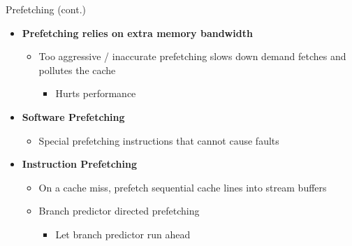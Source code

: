 \documentclass[aspectratio=169,12pt]{beamer}
\begin{document}
\begin{frame}{Prefetching (cont.)}
\begin{itemize}
  \item \textbf{Prefetching relies on extra memory bandwidth}
  \begin{itemize}
    \item Too aggressive / inaccurate prefetching slows down demand fetches and pollutes the cache
    \begin{itemize}
      \item Hurts performance
    \end{itemize}
  \end{itemize}
  
  \item \textbf{Software Prefetching}
  \begin{itemize}
    \item Special prefetching instructions that cannot cause faults
  \end{itemize}
  
  \item \textbf{Instruction Prefetching}
  \begin{itemize}
    \item On a cache miss, prefetch sequential cache lines into stream buffers
    \item Branch predictor directed prefetching
    \begin{itemize}
      \item Let branch predictor run ahead
    \end{itemize}
  \end{itemize}
\end{itemize}
\end{frame}
\end{document}
